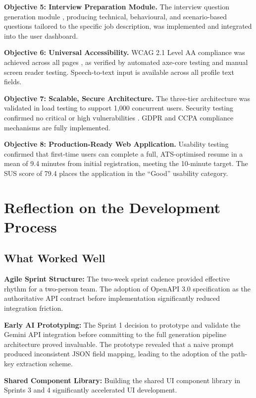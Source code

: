\documentclass[12pt, a4paper, oneside]{report}
\begin{document}
\textbf{Objective 5: Interview Preparation Module.} The interview question generation module \cite{gemini2023}, producing technical, behavioural, and scenario-based questions tailored to the specific job description, was implemented and integrated into the user dashboard.

\textbf{Objective 6: Universal Accessibility.} WCAG 2.1 Level AA compliance was achieved across all pages \cite{wcag21}, as verified by automated axe-core testing and manual screen reader testing. Speech-to-text input \cite{sears2003} is available across all profile text fields.

\textbf{Objective 7: Scalable, Secure Architecture.} The three-tier architecture was validated in load testing \cite{k62024} to support 1,000 concurrent users. Security testing confirmed no critical or high vulnerabilities \cite{owasp2021}. GDPR \cite{gdpr2016} and CCPA \cite{ccpa2018} compliance mechanisms are fully implemented.

\textbf{Objective 8: Production-Ready Web Application.} Usability testing \cite{sus1996} confirmed that first-time users can complete a full, ATS-optimised resume in a mean of 9.4 minutes from initial registration, meeting the 10-minute target. The SUS score of 79.4 places the application in the ``Good'' usability category.

\section{Reflection on the Development Process}

\subsection{What Worked Well}

\textbf{Agile Sprint Structure:} The two-week sprint cadence \cite{scrum2020} provided effective rhythm for a two-person team. The adoption of OpenAPI 3.0 \cite{openapi2021} specification as the authoritative API contract before implementation significantly reduced integration friction.

\textbf{Early AI Prototyping:} The Sprint 1 decision to prototype and validate the Gemini API integration \cite{gemini2023} before committing to the full generation pipeline architecture proved invaluable. The prototype revealed that a naive prompt produced inconsistent JSON field mapping, leading to the adoption of the path-key extraction scheme.

\textbf{Shared Component Library:} Building the shared UI component library in Sprints 3 and 4 significantly accelerated UI development.
\end{document}
